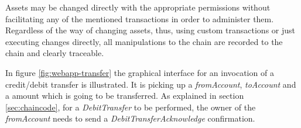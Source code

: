 Assets may be changed directly with the appropriate permissions without facilitating any of the mentioned transactions in order to administer them. Regardless of the way of changing assets, thus, using custom transactions or just executing changes directly, all manipulations to the chain are recorded to the chain and clearly traceable.

In figure \ref{fig:webapp-transfer} the graphical interface for an invocation of a credit/debit transfer is illustrated. It is picking up a \textit{fromAccount}, \textit{toAccount} and a amount which is going to be transferred. As explained in section \ref{sec:chaincode}, for a \textit{DebitTransfer} to be performed, the owner of the \textit{fromAccount} needs to send a \textit{DebitTransferAcknowledge} confirmation.